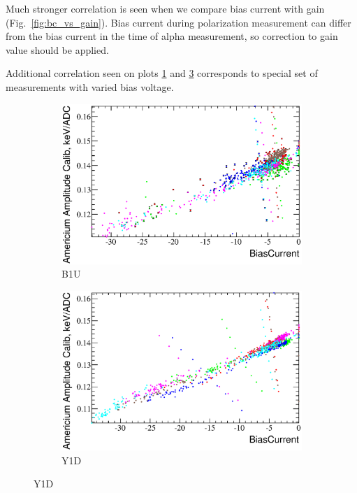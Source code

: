 \documentclass[a4paper,12pt]{article}
\begin{document}
Much stronger correlation is seen when we compare bias current with gain (Fig.~\ref{fig:bc_vs_gain}).
Bias current during polarization measurement can differ from the bias current in the time of
alpha measurement, so correction to gain value should be applied.

Additional correlation seen on plots \ref{bc_vs_gain-b1u} and \ref{bc_vs_gain-y1d} corresponds to
special set of measurements with varied bias voltage.

\newcommand\bcvsgainlabel{Bias current versus americium gain ($E_{\text{Am}} / \mu_{\text{Am}}$) dependency}
\begin{figure}[p]
\begin{subfigure}[b]{0.5\textwidth}
\includegraphics[width=\textwidth]{gfx/run13_alpha_study/B1U/c_hBiasCurrent_AmGain.eps}
\caption{B1U}\label{bc_vs_gain-b1u}
\end{subfigure}
\begin{subfigure}[b]{0.5\textwidth}
\includegraphics[width=\textwidth]{gfx/run13_alpha_study/Y1D/c_hBiasCurrent_AmGain.eps}
\caption{Y1D}\label{bc_vs_gain-y1d}
\end{subfigure}


\end{figure}
\end{document}
